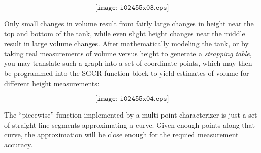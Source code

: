 $$\texttt{[image: i02455x03.eps]}$$

Only small changes in volume result from fairly large changes in height near the top and bottom of the tank, while even slight height changes near the middle result in large volume changes.  After mathematically modeling the tank, or by taking real measurements of volume versus height to generate a {\it strapping table}, you may translate such a graph into a set of coordinate points, which may then be programmed into the SGCR function block to yield estimates of volume for different height measurements:

$$\texttt{[image: i02455x04.eps]}$$

The ``piecewise'' function implemented by a multi-point characterizer is just a set of straight-line segments approximating a curve.  Given enough points along that curve, the approximation will be close enough for the requied measurement accuracy.




